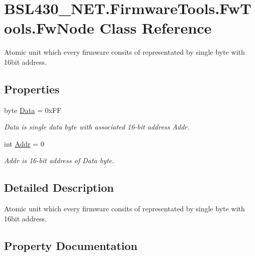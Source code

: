 \hypertarget{class_b_s_l430___n_e_t_1_1_firmware_tools_1_1_fw_tools_1_1_fw_node}{}\section{B\+S\+L430\+\_\+\+N\+E\+T.\+Firmware\+Tools.\+Fw\+Tools.\+Fw\+Node Class Reference}
\label{class_b_s_l430___n_e_t_1_1_firmware_tools_1_1_fw_tools_1_1_fw_node}


Atomic unit which every firmware consits of representated by single byte with 16bit address.  


\subsection*{Properties}
\begin{DoxyCompactItemize}
\item 
byte \mbox{\hyperlink{class_b_s_l430___n_e_t_1_1_firmware_tools_1_1_fw_tools_1_1_fw_node_ad83b49ec9c18f1228debdc953e51c954}{Data}} = 0x\+FF
\begin{DoxyCompactList}\small\item\em Data is single data byte with associated 16-\/bit address Addr. \end{DoxyCompactList}\item 
int \mbox{\hyperlink{class_b_s_l430___n_e_t_1_1_firmware_tools_1_1_fw_tools_1_1_fw_node_a1f1744c0d5f5fe4b776fe9b645954bbd}{Addr}} = 0
\begin{DoxyCompactList}\small\item\em Addr is 16-\/bit address of Data byte. \end{DoxyCompactList}\end{DoxyCompactItemize}


\subsection{Detailed Description}
Atomic unit which every firmware consits of representated by single byte with 16bit address. 



\subsection{Property Documentation}
\mbox{\label{class_b_s_l430___n_e_t_1_1_firmware_tools_1_1_fw_tools_1_1_fw_node_a1f1744c0d5f5fe4b776fe9b645954bbd}} 
